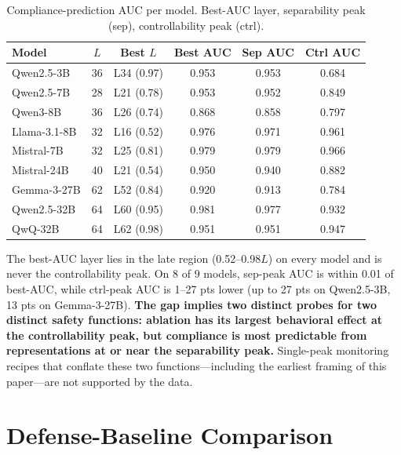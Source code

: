 \documentclass{article}
\begin{document}
\begin{table}[t]
\caption{Compliance-prediction AUC per model. Best-AUC layer, separability peak (sep), controllability peak (ctrl).}
\label{tab:defense}
\begin{center}
\scriptsize
\begin{tabular}{lccc>{\columncolor{sepshade}}c>{\columncolor{ctrlshade}}c}
\toprule
\textbf{Model} & $L$ & \textbf{Best $L$} & \textbf{Best AUC} & \textbf{Sep AUC} & \textbf{Ctrl AUC} \\
\midrule
Qwen2.5-3B    & 36 & L34 (0.97) & 0.953 & 0.953 & 0.684 \\
Qwen2.5-7B    & 28 & L21 (0.78) & 0.953 & 0.952 & 0.849 \\
Qwen3-8B      & 36 & L26 (0.74) & 0.868 & 0.858 & 0.797 \\
Llama-3.1-8B  & 32 & L16 (0.52) & 0.976 & 0.971 & 0.961 \\
Mistral-7B    & 32 & L25 (0.81) & 0.979 & 0.979 & 0.966 \\
Mistral-24B   & 40 & L21 (0.54) & 0.950 & 0.940 & 0.882 \\
Gemma-3-27B   & 62 & L52 (0.84) & 0.920 & 0.913 & 0.784 \\
Qwen2.5-32B   & 64 & L60 (0.95) & 0.981 & 0.977 & 0.932 \\
\rowcolor{reasoning} QwQ-32B       & 64 & L62 (0.98) & 0.951 & 0.951 & 0.947 \\
\bottomrule
\end{tabular}
\end{center}
\vskip -0.1in
\end{table}

The best-AUC layer lies in the late region (0.52--0.98$L$) on every model and is never the controllability peak. On 8 of 9 models, sep-peak AUC is within 0.01 of best-AUC, while ctrl-peak AUC is 1--27 pts lower (up to 27 pts on Qwen2.5-3B, 13 pts on Gemma-3-27B). \textbf{The gap implies two distinct probes for two distinct safety functions: ablation has its largest behavioral effect at the controllability peak, but compliance is most predictable from representations at or near the separability peak.} Single-peak monitoring recipes that conflate these two functions---including the earliest framing of this paper---are not supported by the data.

\section{Defense-Baseline Comparison}
\label{sec:defense_baselines}
\label{app:defbase}
\end{document}
